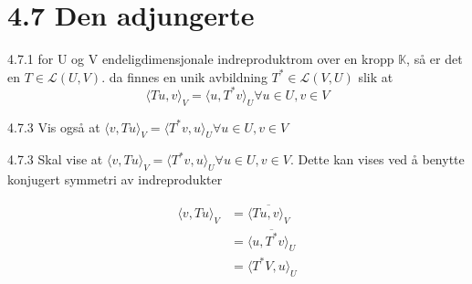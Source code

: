 \documentclass[a4paper,norsk]{article}
\begin{document}
\section*{4.7 Den adjungerte}


\begin{theorembox}{4.7.1}{}
for U og V endeligdimensjonale indreproduktrom over en kropp $ \mathbb{K} $, så er det en $ T \in \mathcal{L} \left( U, V \right)  $. da finnes en unik avbildning $ T^* \in \mathcal{L} \left( V, U \right) $ slik at \[
    \langle Tu, v \rangle_{ V } = \langle u, T^*v \rangle_{ U } \forall u\in U, v \in V 
\]

\end{theorembox}



  
\begin{oppgavebox}{4.7.3}{}
Vis også at $ \langle v, Tu \rangle_{ V } = \langle T^*v, u \rangle_{ U } \forall u\in U, v \in V $

\begin{proofbox}{4.7.3}{}
Skal vise at $ \langle v, Tu \rangle_{ V } = \langle T^*v, u \rangle_{ U }  \forall u \in U, v \in V$. Dette kan vises ved å benytte konjugert symmetri av indreprodukter

\begin{align*}
    \langle v, Tu \rangle_{ V } &= \overline{ \langle Tu, v \rangle_{ V } }\\
    &= \overline{ \langle u, T^*v \rangle_{ U }  } \\
    &= \langle T^*V, u \rangle_{ U }     
\end{align*}

\end{proofbox}
\end{oppgavebox}
\end{document}
